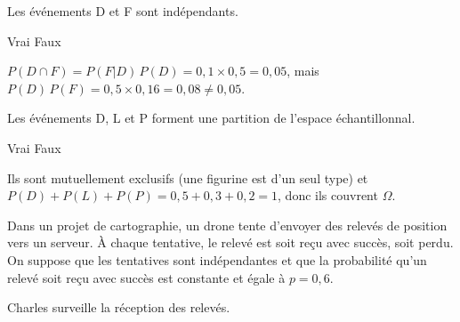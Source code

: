 \begin{questions}
\begin{parts}
\begin{subparts}
        \subpart[1] Les événements D et F sont indépendants.
        
        \begin{oneparcheckboxes}
            \choice Vrai
            \correctchoice Faux
        \end{oneparcheckboxes}
        \begin{solution}
        $P(D\cap F)=P(F|D)\,P(D)=0{,}1\times 0{,}5=0{,}05$, mais $P(D)\,P(F)=0{,}5\times 0{,}16=0{,}08\neq 0{,}05$.
        \end{solution}

        \subpart[1] Les événements D, L et P forment une partition de l'espace échantillonnal.
        
        \begin{oneparcheckboxes}
            \correctchoice Vrai
            \choice Faux
        \end{oneparcheckboxes}
        \begin{solution}
        Ils sont mutuellement exclusifs (une figurine est d'un seul type) et $P(D)+P(L)+P(P)=0{,}5+0{,}3+0{,}2=1$, donc ils couvrent $\Omega$.
        \end{solution}
    \end{subparts}
    \vspace{0.5cm}
\end{parts}

\pageblanche




\question[]

Dans un projet de cartographie, un drone tente d’envoyer des relevés de
position vers un serveur. À chaque tentative, le relevé est soit reçu
avec succès, soit perdu. On suppose que les tentatives sont indépendantes
et que la probabilité qu’un relevé soit reçu avec succès est constante et
égale à $p=0{,}6$.

Charles surveille la réception des relevés.

\end{questions}
